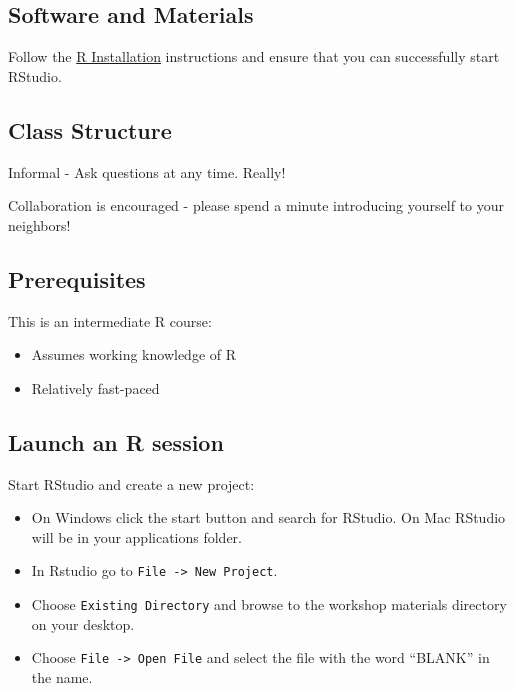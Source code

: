 \documentclass[
]{book}
\providecommand{\tightlist}{%
  \setlength{\itemsep}{0pt}\setlength{\parskip}{0pt}}
\begin{document}
\hypertarget{software-and-materials-2}{%
\subsection{Software and Materials}\label{software-and-materials-2}}

Follow the \href{./Rinstall.html}{R Installation} instructions and ensure that you can successfully start RStudio.

\hypertarget{class-structure-2}{%
\subsection{Class Structure}\label{class-structure-2}}

Informal - Ask questions at any time. Really!

Collaboration is encouraged - please spend a minute introducing yourself to your neighbors!

\hypertarget{prerequisites-2}{%
\subsection{Prerequisites}\label{prerequisites-2}}

This is an intermediate R course:

\begin{itemize}
\tightlist
\item
  Assumes working knowledge of R
\item
  Relatively fast-paced
\end{itemize}

\hypertarget{launch-an-r-session-1}{%
\subsection{Launch an R session}\label{launch-an-r-session-1}}

Start RStudio and create a new project:

\begin{itemize}
\tightlist
\item
  On Windows click the start button and search for RStudio. On Mac RStudio will be in your applications folder.
\item
  In Rstudio go to \texttt{File\ -\textgreater{}\ New\ Project}.
\item
  Choose \texttt{Existing\ Directory} and browse to the workshop materials directory on your desktop.
\item
  Choose \texttt{File\ -\textgreater{}\ Open\ File} and select the file with the word ``BLANK'' in the name.
\end{itemize}
\end{document}
